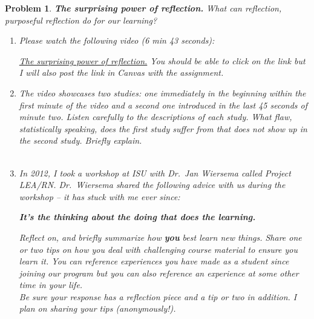 \documentclass[11pt]{exam}
\newtheorem{problem}{Problem}
\newcommand{\1}{\boldsymbol{1}}
\newcommand{\0}{\boldsymbol{0}}
\begin{document}
\begin{problem} {\textbf{The surprising power of reflection.}} What can reflection, purposeful reflection do for our learning?

\begin{enumerate}
\item[a)] Please watch the following video (6 min 43 seconds): 

\href{https://thelearnerlab.us4.list-manage.com/track/click?u=650effaf591ee7171e0472541&id=ba9ae9d9c6&e=552083b364}{The surprising power of reflection.} You should be able to click on the link but I will also post the link in Canvas with the assignment.
\item[b)] The video showcases two studies: one immediately in the beginning within the first minute of the video and a second one introduced in the last 45 seconds of minute two.  Listen carefully to the descriptions of each study. What \textit{flaw}, statistically speaking, does the first study suffer from that does not show up in the second study. Briefly explain.\\ \\[4cm]
\item[c)] In 2012, I took a workshop at ISU with Dr.\ Jan Wiersema called Project LEA/RN. Dr.\ Wiersema shared the following advice with us during the workshop -- it has stuck with me ever since: 
\begin{center}
\textbf{It's the thinking about the doing that does the learning.}
\end{center}
Reflect on, and briefly summarize how \textbf{you} best learn new things. Share one or two tips on how you deal with challenging course material to ensure you learn it. You can reference experiences you have made as a student since joining our program but you can also reference an experience at some other time in your life. \\
Be sure your response has a reflection piece and a tip or two in addition. I plan on sharing your tips (anonymously!).\\
\end{enumerate}
\end{problem}
\end{document}
